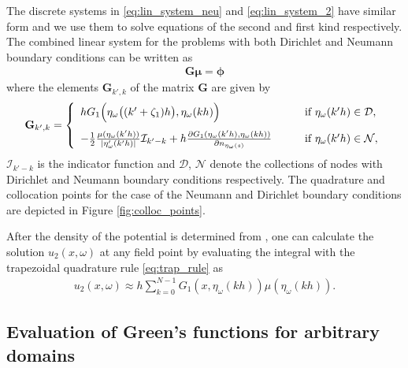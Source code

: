 The discrete systems in \eqref{eq:lin_system_neu} and \eqref{eq:lin_system_2} have similar form and we use them to solve equations of the second and first kind respectively.
The combined linear system for the problems with both Dirichlet and Neumann boundary conditions can be written as
\begin{align}\label{eq:lin_system_final}
    \mathbf{G} \boldsymbol{\mu} = \boldsymbol{\phi}
\end{align}
where the elements $\mathbf{G}_{k',k}$ of the matrix $\mathbf{G}$ are given by
\begin{align*}
    \mathbf{G}_{k',k} = 
    \left\{
		\begin{array}{l l}
			h G_1\Big( \eta_{\omega}\big((k'+\zeta_1)h\big), \eta_{\omega}(kh) \Big) &\qquad \text{if  } \eta_{\omega}(k'h)\in\mathcal{D},
			\\[1em]
			-\frac{1}{2} \frac{\mu(\eta_{\omega}(k'h))}{\left| \eta_{\omega}'(k'h) \right|} \mathcal{I}_{k'-k} + h \frac{\partial G_1(\eta_{\omega}(k'h),\eta_{\omega}(kh))}{\partial n_{\eta_{\omega}(s)}} &\qquad \text{if  } \eta_{\omega}(k'h)\in\mathcal{N},
		\end{array}
	\right.
\end{align*}
$\mathcal{I}_{k'-k}$ is the indicator function and $\mathcal{D}$, $\mathcal{N}$ denote the collections of nodes with Dirichlet and Neumann boundary conditions respectively.
The quadrature and collocation points for the case of the Neumann and Dirichlet boundary conditions are depicted in Figure \ref{fig:colloc_points}.

After the density of the potential is determined from \change{\eqref{eq:lin_system_final}}, one can calculate the solution $u_2(x,\omega)$ at any field point by evaluating the integral with the trapezoidal quadrature rule \eqref{eq:trap_rule} as
\begin{align*}
	u_2(x,\omega) %
	\approx h \sum_{k=0}^{N-1} G_1(x,\eta_{\omega}(kh)) \mu(\eta_{\omega}(kh)).
\end{align*}




\subsection{Evaluation of Green's functions for arbitrary domains}
\label{sec:num_GF}

